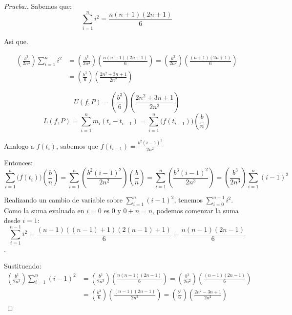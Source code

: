 \documentclass[12pt]{article}
\begin{document}
\begin{enumerate}[\hspace{9px} a)]
\begin{proof}[Prueba:]
            Sabemos que: \[\sum_{i=1}^n i^2 = \frac{n(n+1)(2n+1)}{6}\]

            Asi que.

            \begin{align*}
                \left(\frac{b^3}{2n^3}\right) \sum_{i=1}^n i^2 &= \left(\frac{b^3}{2n^3}\right)\left(\frac{n(n+1)(2n+1)}{6}\right) = \left(\frac{b^3}{2n^2}\right)\left(\frac{(n+1)(2n+1)}{6}\right) \\
                &= \left(\frac{b^3}{6}\right)\left(\frac{2n^2+3n+1}{2n^2}\right)
            \end{align*}

            \[U(f,P)=\left(\frac{b^3}{6}\right)\left(\frac{2n^2+3n+1}{2n^2}\right)\]
            \begin{equation*}
                L(f,P)=\sum_{i=1}^n m_i(t_i-t_{i-1}) = \sum_{i=1}^n \big(f(t_{i-1})\big)\left(\displaystyle\frac{b}{n}\right)
            \end{equation*}

            Analogo a \(f(t_i)\), sabemos que \(f(t_{i-1})=\displaystyle\frac{b^2(i-1)^2}{2n^2}\)

            Entonces:
            \begin{equation*}
                \sum_{i=1}^n \big(f(t_i)\big)\left(\displaystyle\frac{b}{n}\right) = \sum_{i=1}^n \left(\frac{b^2(i-1)^2}{2n^2}\right)\left(\displaystyle\frac{b}{n}\right) = \sum_{i=1}^n \left(\frac{b^3(i-1)^2}{2n^3}\right) = \left(\frac{b^3}{2n^3}\right) \sum_{i=1}^n (i-1)^2
            \end{equation*}

            Realizando un cambio de variable sobre \(\sum_{i=1}^n (i-1)^2\), tenemos \(\sum_{i=0}^{n-1} i^2\). Como la suma evaluada en $i=0$ es 0 y \(0+n=n\), podemos comenzar la suma desde \(i=1\): \[\sum_{i=1}^{n-1} i^2 = \displaystyle\frac{(n-1)((n-1)+1)(2(n-1)+1)}{6} = \frac{n(n-1)(2n-1)}{6}\].

            Sustituendo:
            \begin{align*}
                \left(\frac{b^3}{2n^3}\right)\sum_{i=1}^n (i-1)^2 &= \left(\frac{b^3}{2n^3}\right)\left(\frac{n(n-1)(2n-1)}{6}\right) = \left(\frac{b^3}{2n^2}\right)\left(\frac{(n-1)(2n-1)}{6}\right) \\
                &= \left(\frac{b^3}{6}\right)\left(\frac{(n-1)(2n-1)}{2n^2}\right) = \left(\frac{b^3}{6}\right)\left(\frac{2n^2-3n+1}{2n^2}\right)
            \end{align*}


\end{proof}
\end{enumerate}
\end{document}

